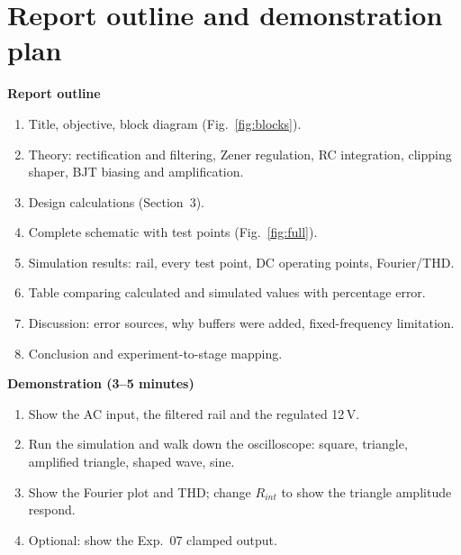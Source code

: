 \section{Report outline and demonstration plan}
\label{sec:report}
\textbf{Report outline}
\begin{enumerate}
\item Title, objective, block diagram (Fig.~\ref{fig:blocks}).
\item Theory: rectification and filtering, Zener regulation, RC integration, clipping shaper, BJT biasing and amplification.
\item Design calculations (Section~3).
\item Complete schematic with test points (Fig.~\ref{fig:full}).
\item Simulation results: rail, every test point, DC operating points, Fourier/THD.
\item Table comparing calculated and simulated values with percentage error.
\item Discussion: error sources, why buffers were added, fixed-frequency limitation.
\item Conclusion and experiment-to-stage mapping.
\end{enumerate}

\textbf{Demonstration (3--5 minutes)}
\begin{enumerate}
\item Show the AC input, the filtered rail and the regulated 12\,V.
\item Run the simulation and walk down the oscilloscope: square, triangle, amplified triangle, shaped wave, sine.
\item Show the Fourier plot and THD; change $R_{int}$ to show the triangle amplitude respond.
\item Optional: show the Exp.\ 07 clamped output.
\end{enumerate}


